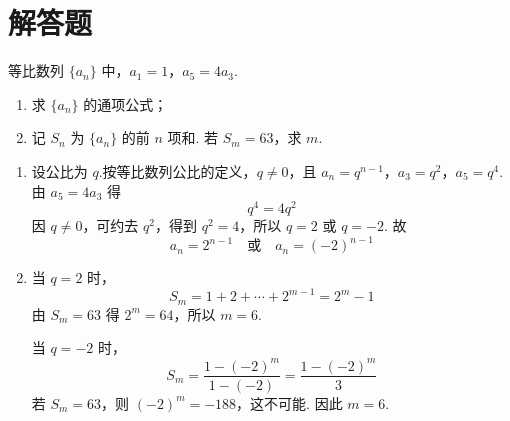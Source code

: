 \section{解答题}

\begin{problem}
等比数列 \(\{a_n\}\) 中，\(a_1=1\)，\(a_5=4a_3\).

\begin{enumerate}
    \item 求 \(\{a_n\}\) 的通项公式；
    \item 记 \(S_n\) 为 \(\{a_n\}\) 的前 \(n\) 项和. 若 \(S_m=63\)，求 \(m\).
\end{enumerate}
\end{problem}

\begin{solution}
\begin{enumerate}
    \item 设公比为 \(q\).按等比数列公比的定义，\(q\ne0\)，且
\(a_n=q^{n-1}\)，\(a_3=q^2\)，\(a_5=q^4\).
    由 \(a_5=4a_3\) 得
    \[
    q^4=4q^2
    \]
    因 \(q\ne0\)，可约去 \(q^2\)，得到 \(q^2=4\)，所以 \(q=2\) 或 \(q=-2\). 故
    \[
    a_n=2^{n-1}\quad\text{或}\quad a_n=(-2)^{n-1}
    \]
    \item 当 \(q=2\) 时，
    \[
    S_m=1+2+\cdots+2^{m-1}=2^m-1
    \]
    由 \(S_m=63\) 得 \(2^m=64\)，所以 \(m=6\).

    当 \(q=-2\) 时，
    \[
    S_m=\frac{1-(-2)^m}{1-(-2)}=\frac{1-(-2)^m}{3}
    \]
    若 \(S_m=63\)，则 \((-2)^m=-188\)，这不可能. 因此 \(m=6\).
\end{enumerate}
\end{solution}

